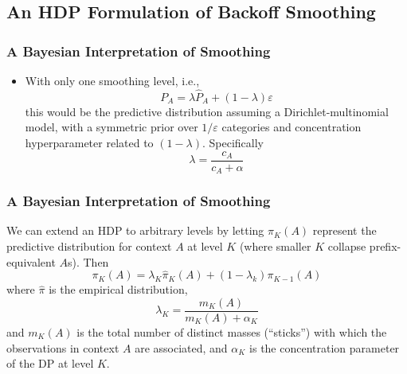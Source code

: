 \documentclass[11pt, serif, mathserif, table,trans]{beamer}
\begin{document}
\subsection{An HDP Formulation of Backoff Smoothing}
\label{sec:an-hdp-formulation}
\begin{frame}
  \frametitle{A Bayesian Interpretation of Smoothing}
  \begin{itemize}[<+->]
  \item With only one smoothing level, i.e.,
    \begin{equation*}
      \label{eq:1}
      P_A = \lambda \hat{P}_A + (1 - \lambda) \varepsilon
    \end{equation*}
    this would be the predictive distribution assuming a
    Dirichlet-multinomial model, with a symmetric prior over $1 /
    \varepsilon$ categories and concentration hyperparameter
    related to $(1 - \lambda)$.  Specifically
    \begin{equation}
      \label{eq:25}
      \lambda = \frac{c_A}{c_A + \alpha}
    \end{equation}
  \end{itemize}
\end{frame}

\begin{frame}
  \frametitle{A Bayesian Interpretation of Smoothing}
  We can extend an HDP to arbitrary levels by letting $\pi_K(A)$
  represent the predictive distribution for context $A$ at level $K$ (where
  smaller $K$ collapse prefix-equivalent $A$s).  Then
    \begin{equation*}
      \label{eq:1}
      \pi_K(A) = \lambda_K \hat{\pi}_K(A) + (1 - \lambda_k) \pi_{K-1}(A)
    \end{equation*}
    where $\hat{\pi}$ is the empirical distribution,
    \begin{equation}
      \label{eq:26}
      \lambda_K = \frac{m_K(A)}{m_K(A) + \alpha_K}
    \end{equation}
    and $m_K(A)$ is the total number of distinct masses (``sticks'') with
    which the observations in context $A$ are associated, and
    $\alpha_K$ is the concentration parameter of the DP at level $K$.
\end{frame}
\end{document}
